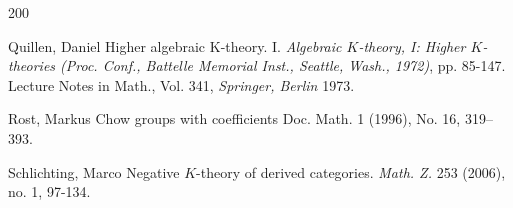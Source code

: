 \documentclass[12pt]{article}
\begin{document}
\begin{thebibliography}{200}








  Quillen, Daniel  Higher algebraic K-theory. I. {\it Algebraic $K$-theory, I: Higher $K$-theories (Proc. Conf., Battelle Memorial Inst., Seattle, Wash., 1972)}, pp. 85-147. Lecture Notes in Math., Vol. 341, {\it Springer, Berlin} 1973.

Rost, Markus
Chow groups with coefficients
Doc. Math. 1 (1996), No. 16, 319–393.


   
 
  
  

   Schlichting, Marco Negative $K$-theory of derived categories. {\it Math. Z.} 253 (2006), no. 1, 97-134. 
  

\end{thebibliography}
\end{document}
